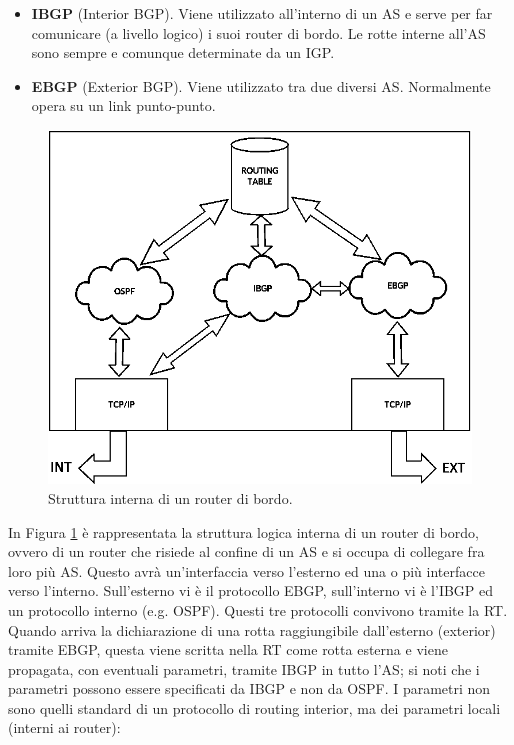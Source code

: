 \begin{itemize}
	\item \textbf{IBGP} (Interior BGP). Viene utilizzato all'interno di un AS e serve per far comunicare (a livello logico) i suoi router di bordo. Le rotte interne all'AS sono sempre e comunque determinate da un IGP.
	\item \textbf{EBGP} (Exterior BGP). Viene utilizzato tra due diversi AS. Normalmente opera su un link punto-punto.
\end{itemize}
\begin{figure}[htbp]
	\centering
	\includegraphics[scale = 0.35]{images/BGP-internal}
	\caption{Struttura interna di un router di bordo.}
	\label{img:BGP-internal}
\end{figure}
In Figura \ref{img:BGP-internal} è rappresentata la struttura logica interna di un router di bordo, ovvero di un router che risiede al confine di un AS e si occupa di collegare fra loro più AS. Questo avrà un'interfaccia verso l'esterno ed una o più interfacce verso l'interno. Sull'esterno vi è il protocollo EBGP, sull'interno vi è l'IBGP ed un protocollo interno (e.g. OSPF). Questi tre protocolli convivono tramite la RT. Quando arriva la dichiarazione di una rotta raggiungibile dall'esterno (exterior) tramite EBGP, questa viene scritta nella RT come rotta esterna e viene propagata, con eventuali parametri, tramite IBGP in tutto l'AS; si noti che i parametri possono essere specificati da IBGP e non da OSPF. I parametri non sono quelli standard di un protocollo di routing interior, ma dei parametri locali (interni ai router):

